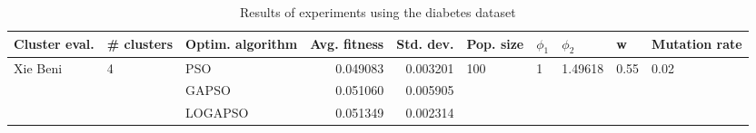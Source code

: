 \begin{table}
\centering
\caption{Results of experiments using the diabetes dataset}
\begin{tabular}{lllrrlllll}
\toprule
            Cluster eval. &        \# clusters & Optim. algorithm &  Avg. fitness &  Std. dev. &            Pop. size &         $\phi_{1}$ &               $\phi_{2}$ &                     w &         Mutation rate \\
\midrule
\multirow{3}{*}{Xie Beni} & \multirow{3}{*}{4} &              PSO &      0.049083 &   0.003201 & \multirow{3}{*}{100} & \multirow{3}{*}{1} & \multirow{3}{*}{1.49618} & \multirow{3}{*}{0.55} & \multirow{3}{*}{0.02} \\
                          &                    &            GAPSO &      0.051060 &   0.005905 &                      &                    &                          &                       &                       \\
                          &                    &          LOGAPSO &      0.051349 &   0.002314 &                      &                    &                          &                       &                       \\
\bottomrule
\end{tabular}
\end{table}
